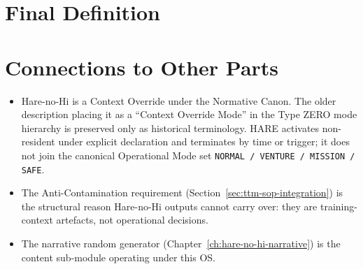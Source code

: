 \section{Final Definition}
\label{sec:hare-final}


\section*{Connections to Other Parts}

\begin{itemize}
\item Hare-no-Hi is a Context Override under the Normative Canon. The
older description placing it as a ``Context Override Mode'' in the Type
ZERO mode hierarchy is preserved only as historical terminology. HARE
activates non-resident under explicit declaration and terminates by time
or trigger; it does not join the canonical Operational Mode set
\texttt{NORMAL / VENTURE / MISSION / SAFE}.
\item The Anti-Contamination requirement
(Section~\ref{sec:ttm-sop-integration}) is the structural reason
Hare-no-Hi outputs cannot carry over: they are training-context
artefacts, not operational decisions.
\item The narrative random generator (Chapter~\ref{ch:hare-no-hi-narrative})
is the content sub-module operating under this OS.
\end{itemize}
